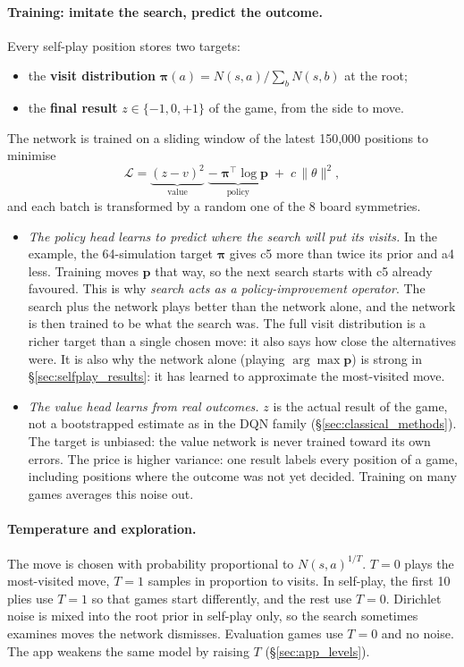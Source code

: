 \documentclass[11pt]{article}
\begin{document}
\paragraph{Training: imitate the search, predict the outcome.} Every self-play
position stores two targets:
\begin{itemize}[leftmargin=*]
  \item the \textbf{visit distribution}
        $\boldsymbol{\pi}(a) = N(s,a)/\sum_b N(s,b)$ at the root;
  \item the \textbf{final result} $z\in\{-1,0,+1\}$ of the game, from the side
        to move.
\end{itemize}
The network is trained on a sliding window of the latest 150{,}000 positions to
minimise
\[
  \mathcal{L} = \underbrace{(z - v)^2}_{\text{value}} \;
  \underbrace{-\;\boldsymbol{\pi}^{\top}\log \mathbf{p}}_{\text{policy}} \;+\; c\,\lVert\theta\rVert^2 ,
\]
and each batch is transformed by a random one of the 8 board symmetries.
\begin{itemize}[leftmargin=*]
  \item \emph{The policy head learns to predict where the search will put its
        visits.} In the example, the 64-simulation target $\boldsymbol{\pi}$
        gives c5 more than twice its prior and a4 less. Training moves $\mathbf{p}$
        that way, so the next search starts with c5 already favoured. This is
        why \emph{search acts as a policy-improvement operator}. The search plus
        the network plays better than the network alone, and the network is then
        trained to be what the search was. The full visit distribution is a
        richer target than a single chosen move: it also says how close the
        alternatives were. It is also why the network alone (playing
        $\arg\max \mathbf{p}$) is strong in \S\ref{sec:selfplay_results}: it has
        learned to approximate the most-visited move.
  \item \emph{The value head learns from real outcomes.} $z$ is the actual
        result of the game, not a bootstrapped estimate as in the DQN family
        (\S\ref{sec:classical_methods}). The target is unbiased: the value
        network is never trained toward its own errors. The price is higher variance:
        one result labels every position of a game, including positions where
        the outcome was not yet decided. Training on many games averages this
        noise out.
\end{itemize}

\paragraph{Temperature and exploration.} The move is chosen with probability
proportional to $N(s,a)^{1/T}$. $T=0$ plays the most-visited move, $T=1$ samples
in proportion to visits. In self-play, the first 10 plies use $T=1$ so that games
start differently, and the rest use $T=0$. Dirichlet noise is mixed into the
root prior in self-play only, so the search sometimes examines moves the
network dismisses. Evaluation games use $T=0$ and no noise. The app weakens the
same model by raising $T$ (\S\ref{sec:app_levels}).
\end{document}
